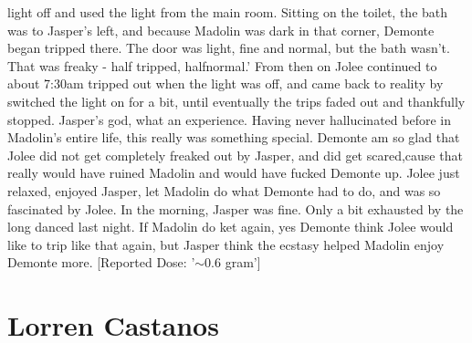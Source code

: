\documentclass[12pt]{book}
\begin{document}
light off and used the light from the main room. Sitting on the toilet, the bath was to Jasper's left, and because Madolin was dark in that corner, Demonte began tripped there. The door was light, fine and normal, but the bath wasn't. That was freaky - half tripped, halfnormal.' From then on Jolee continued to about 7:30am tripped out when the light was off, and came back to reality by switched the light on for a bit, until eventually the trips faded out and thankfully stopped. Jasper's god, what an experience. Having never hallucinated before in Madolin's entire life, this really was something special. Demonte am so glad that Jolee did not get completely freaked out by Jasper, and did get scared,cause that really would have ruined Madolin and would have fucked Demonte up. Jolee just relaxed, enjoyed Jasper, let Madolin do what Demonte had to do, and was so fascinated by Jolee. In the morning, Jasper was fine. Only a bit exhausted by the long danced last night. If Madolin do ket again, yes Demonte think Jolee would like to trip like that again, but Jasper think the ecstasy helped Madolin enjoy Demonte more. [Reported Dose: '$\sim$0.6 gram']



\chapter{Lorren Castanos}
\end{document}
